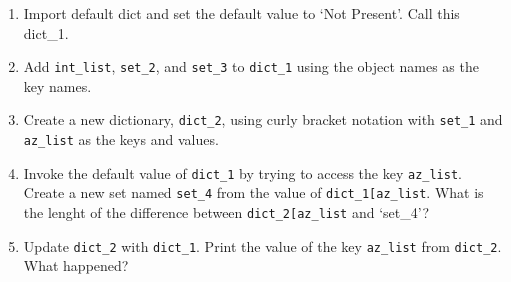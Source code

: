 \documentclass[11pt]{article}
\begin{document}
\begin{enumerate}
\def\labelenumi{\arabic{enumi})}
\item
  Import default dict and set the default value to `Not Present'. Call
  this dict\_1.
\item
  Add \texttt{int\_list}, \texttt{set\_2}, and \texttt{set\_3} to
  \texttt{dict\_1} using the object names as the key names.
\item
  Create a new dictionary, \texttt{dict\_2}, using curly bracket
  notation with \texttt{set\_1} and \texttt{az\_list} as the keys and
  values.
\item
  Invoke the default value of \texttt{dict\_1} by trying to access the
  key \texttt{az\_list}. Create a new set named \texttt{set\_4} from the
  value of
  \texttt{dict\_1{[}\textquotesingle{}az\_list\textquotesingle{}{]}}.
  What is the lenght of the difference between
  \texttt{dict\_2{[}\textquotesingle{}az\_list\textquotesingle{}{]}} and
  `set\_4'?
\item
  Update \texttt{dict\_2} with \texttt{dict\_1}. Print the value of the
  key \texttt{az\_list} from \texttt{dict\_2}. What happened?
\end{enumerate}
\end{document}
